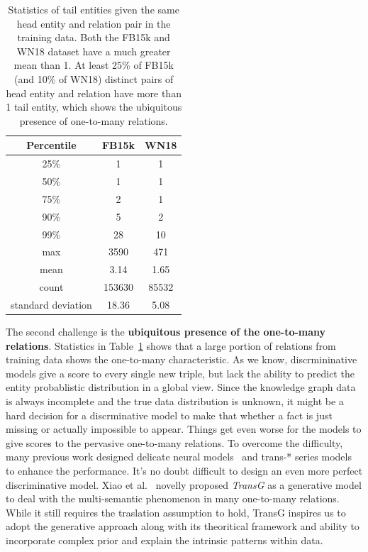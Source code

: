 \documentclass[twocolumn,a4paper,10pt,review,5p]{elsarticle}
\begin{document}
\begin{table}
    \centering
    \begin{tabular}{ccc}
        \toprule
        Percentile & FB15k & WN18 \\
        \midrule
        25\% &  1   & 1  \\
        50\% &  1   & 1 \\
        75\% &  2   & 1 \\
        90\% &  5   & 2 \\
        99\% &  28  & 10 \\
        max & 3590  &  471 \\
        \midrule
        mean &  3.14 & 1.65 \\
        count & 153630 & 85532 \\
        standard deviation & 18.36 & 5.08 \\
        \bottomrule
    \end{tabular}
    \caption{Statistics of tail entities given the same head entity and relation pair in the training data. Both the FB15k and WN18 dataset have a much greater mean than 1. At least 25\% of FB15k (and 10\% of WN18) distinct pairs of head entity and relation have more than 1 tail entity, which shows the ubiquitous presence of one-to-many relations. }
\label{one-to-many}
\end{table}


The second challenge is the \textbf{ubiquitous presence of the one-to-many relations}.
Statistics in Table~\ref{one-to-many} shows that a large portion of relations from training data shows the one-to-many characteristic.
As we know, discrmininative models give a score to every single new triple, but lack the ability to predict the entity probablistic distribution in a global view.
Since the knowledge graph data is always incomplete and the true data distribution is unknown, it might be a hard decision for a discrminative model to make that whether a fact is just missing or actually impossible to appear.
Things get even worse for the models to give scores to the pervasive one-to-many relations.
To overcome the difficulty, many previous work designed delicate neural models~\cite{NTN} and trans-* series models~\cite{TransH2014,TransR2015,TransD} to enhance the performance. It's no doubt difficult to design an even more perfect discriminative model. Xiao et al.~\cite{TransG} novelly proposed \emph{TransG} as a generative model to deal with the multi-semantic phenomenon in many one-to-many relations. While it still requires the traslation assumption to hold, TransG inspires us to adopt the generative approach along with its theoritical framework and ability to incorporate complex prior and explain the intrinsic patterns within data.
\end{document}
